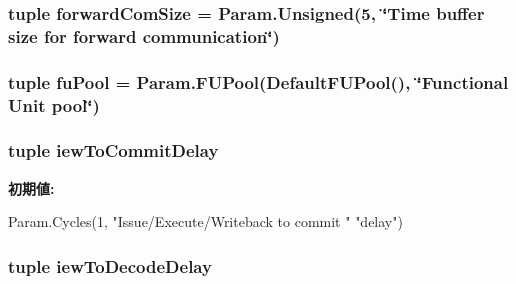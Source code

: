 \label{classO3CPU_1_1DerivO3CPU_a0a9358767ec7c9dfef70564672b53522}
\hypertarget{classO3CPU_1_1DerivO3CPU_a0e528cb0724c691b5eaca85ad02144d8}{
\subsubsection[{forwardComSize}]{\setlength{\rightskip}{0pt plus 5cm}tuple {\bf forwardComSize} = Param.Unsigned(5, \char`\"{}Time buffer size for forward communication\char`\"{})}}
\label{classO3CPU_1_1DerivO3CPU_a0e528cb0724c691b5eaca85ad02144d8}
\hypertarget{classO3CPU_1_1DerivO3CPU_a2e5415d0645b0ec485165d188df68775}{
\subsubsection[{fuPool}]{\setlength{\rightskip}{0pt plus 5cm}tuple {\bf fuPool} = Param.FUPool(DefaultFUPool(), \char`\"{}Functional Unit pool\char`\"{})}}
\label{classO3CPU_1_1DerivO3CPU_a2e5415d0645b0ec485165d188df68775}
\hypertarget{classO3CPU_1_1DerivO3CPU_a724a185702137da4a74c263b1ea63fec}{
\subsubsection[{iewToCommitDelay}]{\setlength{\rightskip}{0pt plus 5cm}tuple {\bf iewToCommitDelay}}}
\label{classO3CPU_1_1DerivO3CPU_a724a185702137da4a74c263b1ea63fec}
{\bfseries 初期値:}
\begin{DoxyCode}
Param.Cycles(1, "Issue/Execute/Writeback to commit "
               "delay")
\end{DoxyCode}
\hypertarget{classO3CPU_1_1DerivO3CPU_a9876f37ad91dd63a32345b53aafbddc6}{
\subsubsection[{iewToDecodeDelay}]{\setlength{\rightskip}{0pt plus 5cm}tuple {\bf iewToDecodeDelay}}}
